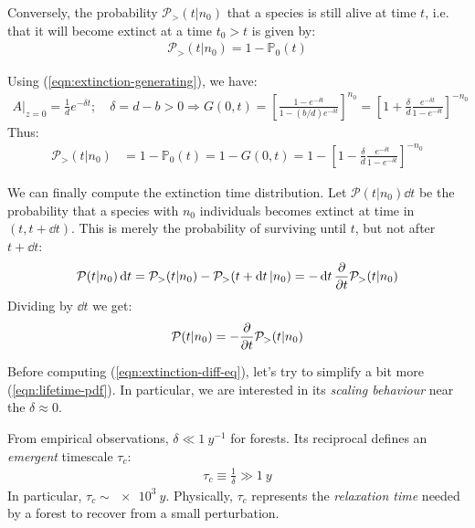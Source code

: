 \documentclass[../../main.tex]{subfiles}
\begin{document}
Conversely, the probability $\mathcal{P}_>(t|n_0)$ that a species is still alive at time $t$, i.e. that it will become extinct at a time $t_0 > t$ is given by:
\begin{align*}
    \mathcal{P}_>(t|n_0) = 1 - \mathbb{P}_0(t)
\end{align*}

Using (\ref{eqn:extinction-generating}), we have:
\begin{align*}
    A\Big|_{z=0} = \frac{1}{d} e^{-\delta t}; \quad \delta = d-b > 0  \Rightarrow G(0,t) = \left[\frac{1 - e^{-\delta t}}{1 - (b/d) e^{-\delta t}} \right]^{n_0} = \left[1 + \frac{\delta}{d} \frac{e^{-\delta t}}{1 - e^{-\delta t}}  \right]^{-n_0}
\end{align*}
Thus:
\begin{align}\label{eqn:lifetime-pdf}
    \mathcal{P}_>(t|n_0) &= 1- \mathbb{P}_0(t) = 1 - G(0,t) = 1 - \left[1- \frac{\delta}{d} \frac{e^{-\delta t}}{1 - e^{-\delta t}}  \right]^{-n_0}
\end{align}

We can finally compute the extinction time distribution. Let $\mathcal{P}(t|n_0) \dd{t}$ be the probability that a species with $n_0$ individuals becomes extinct at time in $(t, t+ \dd{t})$. This is merely the probability of surviving until $t$, but not after $t+ \dd{t}$:
\begin{align*}
    \mathcal{P}(t|n_0)\dd{t} = \mathcal{P}_>(t|n_0) - \mathcal{P}_>(t+\dd{t}|n_0) = - \dd{t} \pdv{t} \mathcal{P}_>(t|n_0)
\end{align*}
Dividing by $\dd{t}$ we get:
\begin{align}\label{eqn:extinction-diff-eq}
    \mathcal{P}(t|n_0) = -\pdv{t} \mathcal{P}_>(t|n_0)
\end{align}


Before computing (\ref{eqn:extinction-diff-eq}), let's try to simplify a bit more (\ref{eqn:lifetime-pdf}). In particular, we are interested in its \textit{scaling behaviour} near the  $\delta \approx 0$.

\medskip

From empirical observations, $\delta \ll \SI{1}{y^{-1}}$ for forests. Its reciprocal defines an \textit{emergent} timescale $\tau_c$:
\begin{align}\label{eqn:tau-c}
    \tau_c \equiv \frac{1}{\delta}  \gg \SI{1}{y}
\end{align} 
In particular, $\tau_c \sim \SI{e3}{y}$. Physically, $\tau_c$ represents the \textit{relaxation time} needed by a forest to recover from a small perturbation. 
\end{document}
